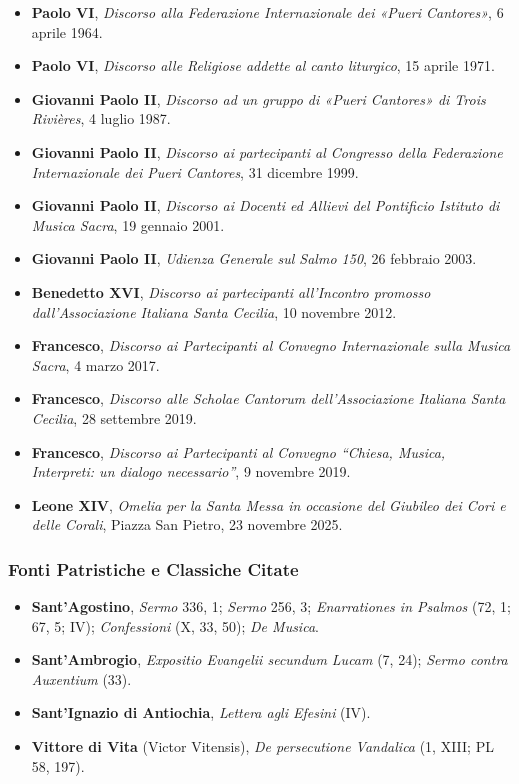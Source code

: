 \documentclass[12pt,a4paper]{article}
\begin{document}
	\begin{itemize}[leftmargin=*]
		\item \textbf{Paolo VI}, \emph{Discorso alla Federazione Internazionale dei «Pueri Cantores»}, 6 aprile 1964.
		\item \textbf{Paolo VI}, \emph{Discorso alle Religiose addette al canto liturgico}, 15 aprile 1971.
		\item \textbf{Giovanni Paolo II}, \emph{Discorso ad un gruppo di «Pueri Cantores» di Trois Rivières}, 4 luglio 1987.
		\item \textbf{Giovanni Paolo II}, \emph{Discorso ai partecipanti al Congresso della Federazione Internazionale dei Pueri Cantores}, 31 dicembre 1999.
		\item \textbf{Giovanni Paolo II}, \emph{Discorso ai Docenti ed Allievi del Pontificio Istituto di Musica Sacra}, 19 gennaio 2001.
		\item \textbf{Giovanni Paolo II}, \emph{Udienza Generale sul Salmo 150}, 26 febbraio 2003.
		\item \textbf{Benedetto XVI}, \emph{Discorso ai partecipanti all'Incontro promosso dall'Associazione Italiana Santa Cecilia}, 10 novembre 2012.
		\item \textbf{Francesco}, \emph{Discorso ai Partecipanti al Convegno Internazionale sulla Musica Sacra}, 4 marzo 2017.
		\item \textbf{Francesco}, \emph{Discorso alle Scholae Cantorum dell'Associazione Italiana Santa Cecilia}, 28 settembre 2019.
		\item \textbf{Francesco}, \emph{Discorso ai Partecipanti al Convegno ``Chiesa, Musica, Interpreti: un dialogo necessario''}, 9 novembre 2019.
		\item \textbf{Leone XIV}, \emph{Omelia per la Santa Messa in occasione del Giubileo dei Cori e delle Corali}, Piazza San Pietro, 23 novembre 2025.
	\end{itemize}
	
	\subsubsection{Fonti Patristiche e Classiche Citate}\label{fonti-patristiche-e-classiche-citate}
	
	\begin{itemize}[leftmargin=*]
		\item \textbf{Sant'Agostino}, \emph{Sermo} 336, 1; \emph{Sermo} 256, 3; \emph{Enarrationes in Psalmos} (72, 1; 67, 5; IV); \emph{Confessioni} (X, 33, 50); \emph{De Musica}.
		\item \textbf{Sant'Ambrogio}, \emph{Expositio Evangelii secundum Lucam} (7, 24); \emph{Sermo contra Auxentium} (33).
		\item \textbf{Sant'Ignazio di Antiochia}, \emph{Lettera agli Efesini} (IV).
		\item \textbf{Vittore di Vita} (Victor Vitensis), \emph{De persecutione Vandalica} (1, XIII; PL 58, 197).
	\end{itemize}
	
\end{document}
